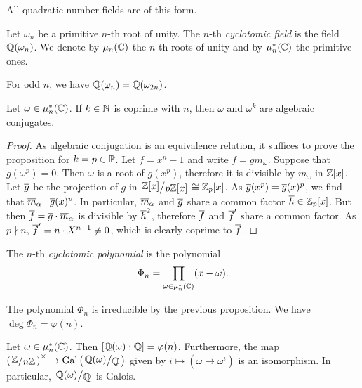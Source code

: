 \begin{opomba}
All quadratic number fields are of this form.
\end{opomba}

\begin{definicija}
Let $\omega_n$ be a primitive $n$-th root of
unity. The $n$-th
\emph{cyclotomic field} is the field
$\Q(\omega_n)$. We denote by $\mu_n(\C)$ the $n$-th roots of unity
and by $\mu_n^*(\C)$ the primitive ones.
\end{definicija}

\begin{opomba}
For odd $n$, we have $\Q(\omega_n) = \Q(\omega_{2n})$.
\end{opomba}

\begin{trditev}
Let $\omega \in \mu_n^*(\C)$. If $k \in \N$ is coprime with $n$,
then $\omega$ and $\omega^k$ are algebraic conjugates.
\end{trditev}

\begin{proof}
As algebraic conjugation is an equivalence relation, it suffices to
prove the proposition for $k = p \in \P$. Let $f = x^n - 1$ and
write $f = g m_\omega$. Suppose that $g(\omega^p) = 0$. Then
$\omega$ is a root of $g(x^p)$, therefore it is divisible by
$m_\omega$ in $\Z[x]$. Let $\oline{g}$ be the projection of $g$ in
$\kvoc{\Z[x]}{p \Z[x]} \cong \Z_p[x]$. As
$\oline{g}(x^p) = \oline{g}(x)^p$, we find that
$\oline{m}_\alpha \mid \oline{g}(x)^p$. In particular,
$\oline{m}_\alpha$ and $\oline{g}$ share a common factor
$\oline{h} \in \Z_p[x]$. But then
$\oline{f} = \oline{g} \cdot \oline{m}_\alpha$ is divisible by
$\oline{h}^2$, therefore $\oline{f}$ and $\oline{f}'$ share a
common factor. As $p \nmid n$,
$\oline{f}' = n \cdot X^{n-1} \ne 0$, which is clearly coprime to
$\oline{f}$.
\end{proof}

\begin{definicija}
The $n$-th
\emph{cyclotomic polynomial} is the
polynomial
\[
\Phi_n = \prod_{\omega \in \mu_n^*(\C)} (x - \omega).
\]
\end{definicija}

\begin{opomba}
The polynomial $\Phi_n$ is irreducible by the previous proposition.
We have $\deg \Phi_n = \varphi(n)$.
\end{opomba}

\begin{trditev}
Let $\omega \in \mu_n^*(\C)$. Then
$[\Q(\omega) : \Q] = \varphi(n)$. Furthermore, the map
$\br{\kvoc{\Z}{n \Z}}^\times \to \Gal \br{\kvoc{\Q(\omega)}{\Q}}$
given by $i \mapsto (\omega \mapsto \omega^i)$ is an isomorphism.
In particular, $\kvoc{\Q(\omega)}{\Q}$ is Galois.
\end{trditev}

